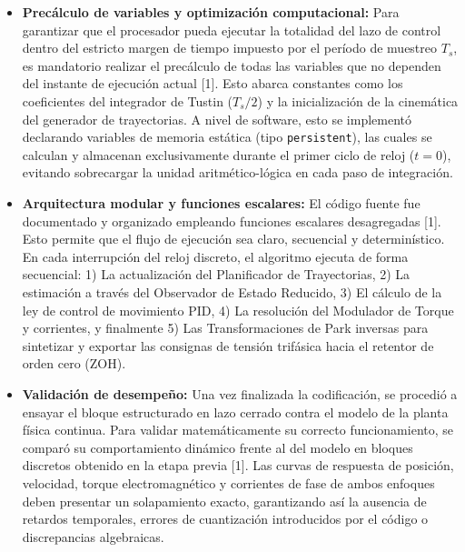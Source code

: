 \documentclass[12pt, a4paper,journal, onecolumn, compsoc]{IEEEtran}
\begin{document}
\begin{itemize}
    \item \textbf{Precálculo de variables y optimización computacional:} Para garantizar que el procesador pueda ejecutar la totalidad del lazo de control dentro del estricto margen de tiempo impuesto por el período de muestreo $T_s$, es mandatorio realizar el precálculo de todas las variables que no dependen del instante de ejecución actual [1]. Esto abarca constantes como los coeficientes del integrador de Tustin ($T_s/2$) y la inicialización de la cinemática del generador de trayectorias. A nivel de software, esto se implementó declarando variables de memoria estática (tipo \texttt{persistent}), las cuales se calculan y almacenan exclusivamente durante el primer ciclo de reloj ($t=0$), evitando sobrecargar la unidad aritmético-lógica en cada paso de integración.
    \item \textbf{Arquitectura modular y funciones escalares:} El código fuente fue documentado y organizado empleando funciones escalares desagregadas [1]. Esto permite que el flujo de ejecución sea claro, secuencial y determinístico. En cada interrupción del reloj discreto, el algoritmo ejecuta de forma secuencial: 1) La actualización del Planificador de Trayectorias, 2) La estimación a través del Observador de Estado Reducido, 3) El cálculo de la ley de control de movimiento PID, 4) La resolución del Modulador de Torque y corrientes, y finalmente 5) Las Transformaciones de Park inversas para sintetizar y exportar las consignas de tensión trifásica hacia el retentor de orden cero (ZOH).
    \item \textbf{Validación de desempeño:} Una vez finalizada la codificación, se procedió a ensayar el bloque estructurado en lazo cerrado contra el modelo de la planta física continua. Para validar matemáticamente su correcto funcionamiento, se comparó su comportamiento dinámico frente al del modelo en bloques discretos obtenido en la etapa previa [1]. Las curvas de respuesta de posición, velocidad, torque electromagnético y corrientes de fase de ambos enfoques deben presentar un solapamiento exacto, garantizando así la ausencia de retardos temporales, errores de cuantización introducidos por el código o discrepancias algebraicas.
\end{itemize}







\end{document}
